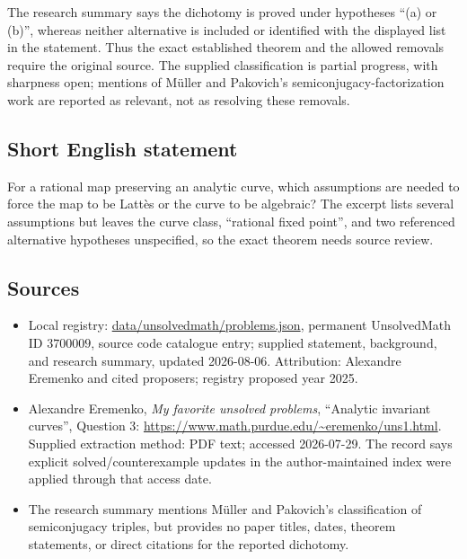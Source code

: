 \documentclass[11pt]{article}
\begin{document}
The research summary says the dichotomy is proved under hypotheses ``(a) or (b)'', whereas neither alternative is included or identified with the displayed list in the statement. Thus the exact established theorem and the allowed removals require the original source. The supplied classification is partial progress, with sharpness open; mentions of M\"uller and Pakovich's semiconjugacy-factorization work are reported as relevant, not as resolving these removals.
\subsection{Short English statement}
For a rational map preserving an analytic curve, which assumptions are needed to force the map to be Latt\`es or the curve to be algebraic? The excerpt lists several assumptions but leaves the curve class, ``rational fixed point'', and two referenced alternative hypotheses unspecified, so the exact theorem needs source review.
\subsection{Sources}
\begin{itemize}
\item Local registry: \url{data/unsolvedmath/problems.json}, permanent UnsolvedMath ID \(3700009\), source code catalogue entry; supplied statement, background, and research summary, updated 2026-08-06. Attribution: Alexandre Eremenko and cited proposers; registry proposed year 2025.
\item Alexandre Eremenko, \emph{My favorite unsolved problems}, ``Analytic invariant curves'', Question 3: \url{https://www.math.purdue.edu/~eremenko/uns1.html}. Supplied extraction method: PDF text; accessed 2026-07-29. The record says explicit solved/counterexample updates in the author-maintained index were applied through that access date.
\item The research summary mentions M\"uller and Pakovich's classification of semiconjugacy triples, but provides no paper titles, dates, theorem statements, or direct citations for the reported dichotomy.
\end{itemize}
\end{document}
